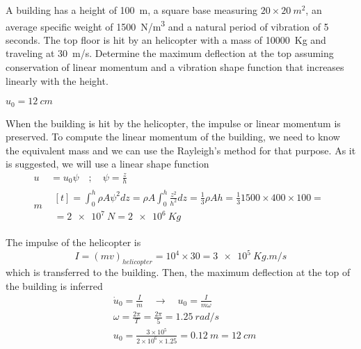 
\begin{Exercise}[label={helicopter_impulse}]
A building has a height of \SI{100}{m}, a square base measuring $20\times\SI{20}{m^2}$, an average specific weight of \SI{1500}{N/m^3} and a natural period of vibration of 5 seconds. The top floor is hit by an helicopter with a mass of \SI{10000}{Kg} and traveling at \SI{30}{m/s}. Determine the maximum deflection at the top assuming conservation of linear momentum and a vibration shape function that increases linearly with the height.

\begin{center}
\end{center}

\shortAnswer $u_0 = \SI{12}{cm}$
\end{Exercise}



\begin{Answer}[ref={helicopter_impulse}]
When the building is hit by the helicopter, the impulse or linear momentum is preserved. To compute the linear momentum of the building, we need to know the equivalent mass and we can use the Rayleigh's method for that purpose. As it is suggested, we will use a linear shape function
\begin{align*}
u& = u_0\psi \quad ; \quad \psi = \frac{z}{h} \\
m& \begin{multlined}[t]= \int_0^h \rho A\psi^2dz = \rho A\int_0^h\frac{z^2}{h^2}dz = \frac{1}{3}\rho Ah = \frac{1}{3} 1500 \times 400 \times 100 = \\
    = \SI{2e7}{N} = \SI{2e6}{Kg} \end{multlined}
\end{align*}

The impulse of the helicopter is
$$
I = (mv)_{helicopter} = 10^4 \times 30 = \SI{3e5}{Kg.m/s}
$$
which is transferred to the building. Then, the maximum deflection at the top of the building is inferred
\begin{align*}
&\dot{u}_0 = \frac{I}{m} \quad \rightarrow \quad u_0 = \frac{I}{m\omega} \\
&\omega = \frac{2\pi}{T} = \frac{2\pi}{5} = \SI{1.25}{rad/s} \\
&u_0 = \frac{3\times 10^5}{2\times 10^6\times 1.25} = \SI{0.12}{m} = \SI{12}{cm}
\end{align*}
\end{Answer}
